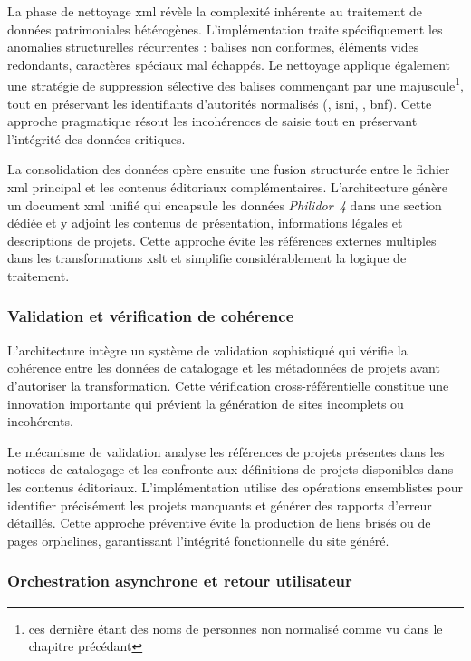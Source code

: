 La phase de nettoyage \gls{xml} révèle la complexité inhérente au traitement de données patrimoniales hétérogènes. L'implémentation traite spécifiquement les anomalies structurelles récurrentes : balises  non conformes, éléments vides redondants, caractères spéciaux mal échappés. Le nettoyage applique également une stratégie de suppression sélective des balises commençant par une majuscule\footnote{ces dernière étant des noms de personnes non normalisé comme vu dans le chapitre précédant}, tout en préservant les identifiants d'autorités normalisés (, \gls{isni}, , \gls{bnf}). Cette approche pragmatique résout les incohérences de saisie tout en préservant l'intégrité des données critiques.

La consolidation des données opère ensuite une fusion structurée entre le fichier \gls{xml} principal et les contenus éditoriaux complémentaires. L'architecture génère un document \gls{xml} unifié  qui encapsule les données \textit{Philidor~4} dans une section dédiée  et y adjoint les contenus de présentation, informations légales et descriptions de projets. Cette approche évite les références externes multiples dans les transformations \gls{xslt} et simplifie considérablement la logique de traitement.

\subsubsection{Validation et vérification de cohérence}

L'architecture intègre un système de validation sophistiqué qui vérifie la cohérence entre les données de catalogage et les métadonnées de projets avant d'autoriser la transformation. Cette vérification cross-référentielle constitue une innovation importante qui prévient la génération de sites incomplets ou incohérents.

Le mécanisme de validation analyse les références de projets présentes dans les notices de catalogage et les confronte aux définitions de projets disponibles dans les contenus éditoriaux. L'implémentation utilise des opérations ensemblistes pour identifier précisément les projets manquants et générer des rapports d'erreur détaillés. Cette approche préventive évite la production de liens brisés ou de pages orphelines, garantissant l'intégrité fonctionnelle du site généré.

\subsubsection{Orchestration asynchrone et retour utilisateur}

